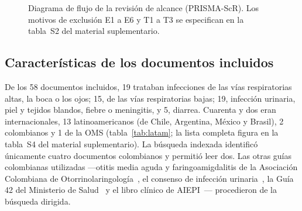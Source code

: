 \documentclass[11pt,a4paper]{article}
\begin{document}
\begin{figure}[htbp]
\caption{Diagrama de flujo de la revisión de alcance (PRISMA-ScR). Los motivos de exclusión E1 a E6 y T1 a T3 se especifican en la tabla~S2 del material suplementario.}
\label{fig:flujo}
\end{figure}

\subsection{Características de los documentos incluidos}

De los 58 documentos incluidos, 19 trataban infecciones de las vías respiratorias altas, la boca o los ojos; 15, de las vías respiratorias bajas; 19, infección urinaria, piel y tejidos blandos, fiebre o meningitis, y 5, diarrea. Cuarenta y dos eran internacionales, 13 latinoamericanos (de Chile, Argentina, México y Brasil), 2 colombianos y 1 de la OMS (tabla~\ref{tab:latam}; la lista completa figura en la tabla~S4 del material suplementario). La búsqueda indexada identificó únicamente cuatro documentos colombianos y permitió leer dos. Las otras guías colombianas utilizadas ---otitis media aguda y faringoamigdalitis de la Asociación Colombiana de Otorrinolaringología~\citep{acorloma2024,acorlfaa2024}, el consenso de infección urinaria~\citep{itucol2023}, la Guía 42 del Ministerio de Salud~\citep{gpc42} y el libro clínico de AIEPI~\citep{aiepi2012}--- procedieron de la búsqueda dirigida.
\end{document}
